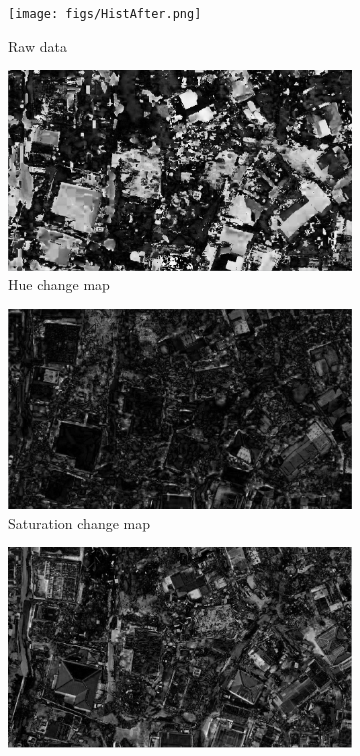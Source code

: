  \begin{figure}[h]
	\centering
	\captionsetup{justification=raggedright,singlelinecheck=false}
	\begin{subfigure}{.8\textwidth}
		\centering
		\texttt{[image: figs/HistAfter.png]}
		\caption{\footnotesize{Raw data}}
	\end{subfigure}
	\begin{subfigure}{.8\textwidth}
		\centering
		\includegraphics[width=.95\linewidth]{figs/HhistMid.png}
		\caption{\footnotesize{Hue change map}}
	\end{subfigure}
	\begin{subfigure}{.8\textwidth}
		\centering
		\includegraphics[width=.95\linewidth]{figs/ShistMid.png}
		\caption{\footnotesize{Saturation change map}}
	\end{subfigure}
	\begin{subfigure}{.8\textwidth}
	\centering
	\includegraphics[width=.95\linewidth]{figs/VhistMid.png}

\end{subfigure}
\end{figure}
